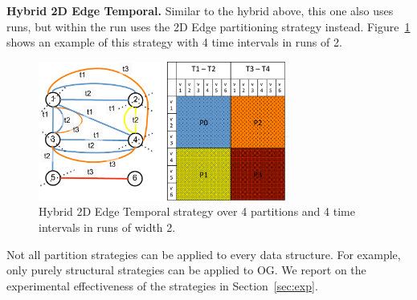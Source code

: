 {\bf Hybrid 2D Edge Temporal.}  Similar to the hybrid above, this one
also uses runs, but within the run uses the 2D Edge partitioning
strategy instead. Figure~\ref{fig:hybrid2d} shows an example of this
strategy with 4 time intervals in runs of 2.

\begin{figure}[t!]
\includegraphics[width=3.2in]{figs/Hybrid2D.pdf}
\caption{Hybrid 2D Edge Temporal strategy over 4 partitions and 4 time
  intervals in runs of width 2.}
\label{fig:hybrid2d}
\end{figure}

Not all partition strategies can be applied to every data structure.
For example, only purely structural strategies can be applied to OG.
We report on the experimental effectiveness of the strategies in
Section~\ref{sec:exp}.


